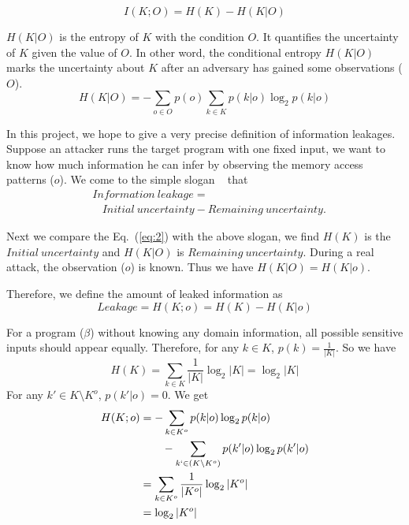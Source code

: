 \begin{equation} \label{eq:2}
    I(K;O) = H(K) - H(K|O)
\end{equation}

$H(K|O)$ is the entropy of $K$ with the condition $O$. It quantifies the
uncertainty of $K$ given the value of $O$. In other word, the conditional
entropy $H(K|O)$ marks the uncertainty about $K$ after an adversary has gained
some observations ($O$).
\begin{equation}
    H(K|O) = - \sum_{o {\in} O} {p(o) \sum_{k {\in} K}{p(k|o)\log_2p(k|o)}}
\end{equation}

In this project, we hope to give a very precise definition of information
leakages. Suppose an attacker runs the target program with one
fixed input, we want to know how much information he can infer by observing the
memory access patterns ($o$). We come to the simple slogan
~\cite{10.1007/978-3-642-00596-1_21} %
that
\begin{align*}
     & \mathit{Information\ leakage} =                                       \\
     & ~~~~ \mathit{Initial\ uncertainty} - \mathit{Remaining\ uncertainty}.
\end{align*}

Next we compare the Eq.~(\ref{eq:2}) with the above slogan, we find $H(K)$
is the $\mathit{Initial\ uncertainty}$ and $H(K|O)$ is $\mathit{Remaining\
        uncertainty}$. During a real attack, the observation ($o$) is known.  Thus we
have $H(K|O) = H(K|o)$.

Therefore, we define the amount of leaked information as
\begin{displaymath}
    Leakage = H(K;o) = H(K) - H(K|o)
\end{displaymath}

For a program ($\beta$) without knowing any domain information, all possible sensitive
inputs should appear equally. Therefore, for any $k \in K$, $p(k) =
    \frac{1}{|K|}$. So we have
$$H(K) = \sum_{k {\in} K}\frac{1}{|K|}\log_2{|K|} = \log_2{|K|}$$
For any $k' \in K \setminus K^o$, $p(k'|o) = 0$. We get
\begin{align*}
    H(K;o) & = - \sum_{k {\in} K^o}{p(k|o)\log_2p(k|o)}                         \\
           & \qquad   - \sum_{k` {\in} (K \setminus K^o)}{p(k'|o)\log_2p(k'|o)} \\
           & = \sum_{k {\in} K^o}\frac{1}{|K^o|}\log_2{|K^o|}                   \\
           & = \log_2{|K^o|}
\end{align*}


